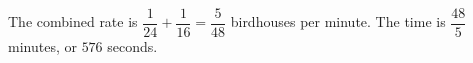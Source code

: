 The combined rate is $\dfrac{1}{24}+\dfrac{1}{16}=\dfrac{5}{48}$ birdhouses per minute. The time is $\dfrac{48}{5}$ minutes, or $\boxed{576}$ seconds.
